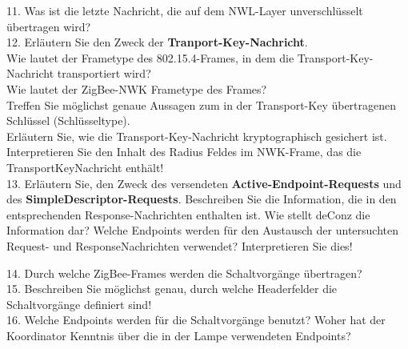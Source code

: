 \begin{Fragen}
    11. Was ist die letzte Nachricht, die auf dem NWL-Layer unverschlüsselt übertragen wird?\\
    
    12. Erläutern Sie den Zweck der \textbf{Tranport-Key-Nachricht}.\\
     Wie lautet der Frametype des 802.15.4-Frames, in dem die Transport-Key-Nachricht transportiert wird? \\
     Wie lautet der ZigBee-NWK Frametype des Frames?\\
     Treffen Sie möglichst genaue Aussagen zum in der Transport-Key übertragenen Schlüssel (Schlüsseltype). \\
     Erläutern Sie, wie die Transport-Key-Nachricht kryptographisch gesichert ist.\\
     Interpretieren Sie den Inhalt des Radius Feldes im NWK-Frame, das die TransportKeyNachricht enthält!\\
    
    13. Erläutern Sie, den Zweck des versendeten \textbf{Active-Endpoint-Requests} und des \textbf{SimpleDescriptor-Requests}.
     Beschreiben Sie die Information, die in den entsprechenden Response-Nachrichten enthalten ist. 
     Wie stellt deConz die Information dar?
     Welche Endpoints werden für den Austausch der untersuchten Request- und ResponseNachrichten verwendet? Interpretieren Sie dies!

    14. Durch welche ZigBee-Frames werden die Schaltvorgänge übertragen? \\
    
    15. Beschreiben Sie möglichst genau, durch welche Headerfelder die Schaltvorgänge definiert sind! \\
        
    16. Welche Endpoints werden für die Schaltvorgänge benutzt? Woher hat der Koordinator Kenntnis über die in der Lampe verwendeten Endpoints? \\
    \end{Fragen}
